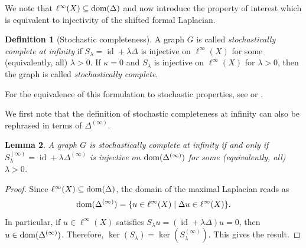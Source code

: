 \documentclass[letterpaper]{article}
\newtheorem{lemma}{Lemma}[section]
\theoremstyle{definition}
\newtheorem{definition}[lemma]{Definition}
\theoremstyle{named}
\numberwithin{equation}{section}
\newcommand{\lm}{\lambda}
\newcommand{\dom}{\textnormal{dom}} %
\newcommand{\id}{\operatorname{id}}
\begin{document}
We note that $\ell^\infty(X) \subseteq \dom(\Delta)$ and 
now introduce the property of interest which is equivalent
to injectivity of the shifted formal Laplacian.
\begin{definition}[Stochastic completeness]\label{def:stochastic_completeness}
    A graph $G$ is called \emph{stochastically complete at infinity} if $S_\lm =\id+\lm \Delta$
    is injective on $\ell^\infty(X)$ for some (equivalently, all) $\lm>0$.
    If $\kappa=0$ and $S_\lm$ is injective on $\ell^\infty(X)$ for $\lm>0$, then the graph
    is called \emph{stochastically complete}.
\end{definition}

For the equivalence of this formulation to stochastic properties, see \cite[Theorem~1]{KL12} or
\cite[Theorems~7.16~and~7.18]{keller2021graphs}.

We first note that the definition of stochastic completeness at infinity
can also be rephrased in terms of $\Delta^{(\infty)}$.
\begin{lemma}\label{l:SC}
    A graph $G$ is stochastically complete at infinity if and only if
    $S_\lm^{(\infty)}=\id+\lm\Delta^{(\infty)}$ is injective on $\dom(\Delta^{(\infty)})$ for some (equivalently, all) $\lambda >0$.
\end{lemma}
\begin{proof}
    Since $\ell^\infty(X) \subseteq \dom(\Delta)$, the domain
    of the maximal Laplacian reads as
$$\dom(\Delta^{(\infty)})= \{u \in \ell^\infty(X) \mid \Delta u \in \ell^\infty(X)\}.$$
    In particular, if $u \in \ell^\infty(X)$ satisfies $S_\lm u =(\id+\lm\Delta)  u=0$,
    then $u \in \dom(\Delta^{(\infty)})$. Therefore, $\ker(S_\lambda)= \ker(S^{(\infty)}_\lambda)$. This gives the result.
\end{proof}
\end{document}
